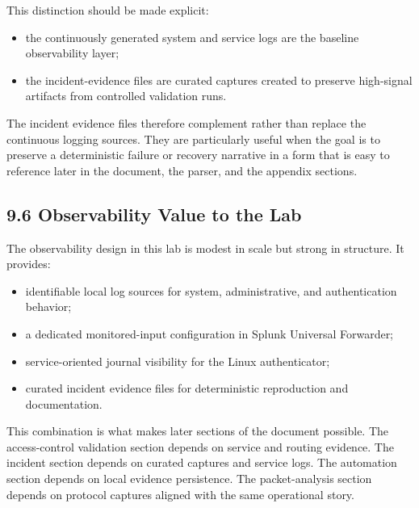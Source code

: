 \documentclass[11pt]{article}
\begin{document}
This distinction should be made explicit:

\begin{itemize}
    \item the continuously generated system and service logs are the baseline observability layer;
    \item the incident-evidence files are curated captures created to preserve high-signal artifacts from controlled validation runs.
\end{itemize}

The incident evidence files therefore complement rather than replace the continuous logging sources. They are particularly useful when the goal is to preserve a deterministic failure or recovery narrative in a form that is easy to reference later in the document, the parser, and the appendix sections.


\subsection{9.6 Observability Value to the Lab}
\label{sec:observability-value-to-the-lab}

The observability design in this lab is modest in scale but strong in structure. It provides:

\begin{itemize}
    \item identifiable local log sources for system, administrative, and authentication behavior;
    \item a dedicated monitored-input configuration in Splunk Universal Forwarder;
    \item service-oriented journal visibility for the Linux authenticator;
    \item curated incident evidence files for deterministic reproduction and documentation.
\end{itemize}

This combination is what makes later sections of the document possible. The access-control validation section depends on service and routing evidence. The incident section depends on curated captures and service logs. The automation section depends on local evidence persistence. The packet-analysis section depends on protocol captures aligned with the same operational story.
\end{document}

